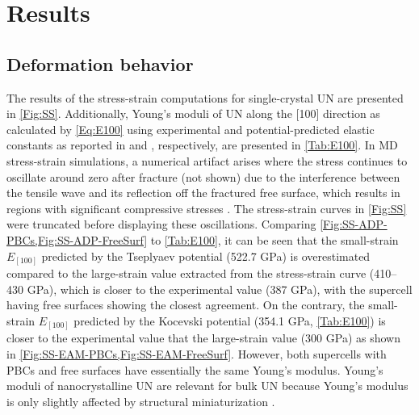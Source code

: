 \documentclass[applsci,article,submit,pdftex,moreauthors]{Definitions/mdpi}
\newcommand{\?}{\stackrel{?}{=}}
\begin{document}

\section{Results}

\subsection{Deformation behavior}
\label{Sec:SS}

The results of the stress-strain computations for single-crystal UN are presented in \cref{Fig:SS}. Additionally, Young's moduli of UN along the [100] direction as calculated by \cref{Eq:E100} using experimental and potential-predicted elastic constants as reported in \cite{Salleh1986} and \cite{AbdulHameed2024}, respectively, are presented in \cref{Tab:E100}. In MD stress-strain simulations, a numerical artifact arises where the stress continues to oscillate around zero after fracture (not shown) due to the interference between the tensile wave and its reflection off the fractured free surface, which results in regions with significant compressive stresses \cite{Wen2022}. The stress-strain curves in \cref{Fig:SS} were truncated before displaying these oscillations. Comparing \cref{Fig:SS-ADP-PBCs,Fig:SS-ADP-FreeSurf} to \cref{Tab:E100}, it can be seen that the small-strain $E_{[100]}$ predicted by the Tseplyaev potential (522.7 GPa) is overestimated compared to the large-strain value extracted from the stress-strain curve (410--430 GPa), which is closer to the experimental value (387 GPa), with the supercell having free surfaces showing the closest agreement. On the contrary, the small-strain $E_{[100]}$ predicted by the Kocevski potential (354.1 GPa, \cref{Tab:E100}) is closer to the experimental value that the large-strain value (300 GPa) as shown in \cref{Fig:SS-EAM-PBCs,Fig:SS-EAM-FreeSurf}. However, both supercells with PBCs and free surfaces have essentially the same Young's modulus. Young’s moduli of nanocrystalline UN are relevant for bulk UN because Young’s modulus is only slightly affected by structural miniaturization \cite{Pal2020}.
\end{document}
